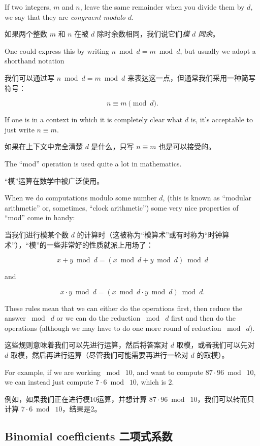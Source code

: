If two integers, $m$ and $n$, leave the same remainder when you
divide them by $d$, we say that they are 
\emph{congruent modulo $d$}.

如果两个整数 $m$ 和 $n$ 在被 $d$ 除时余数相同，我们说它们\emph{模 $d$ 同余}。

One could express this by writing $n \bmod d = m \bmod d$, but usually
we adopt a shorthand notation

我们可以通过写 $n \bmod d = m \bmod d$ 来表达这一点，但通常我们采用一种简写符号：

\[ n \equiv m \pmod{d}.
\]

If one is in a context in which it is completely clear what $d$ is, it's
acceptable to just write $n \equiv m$.

如果在上下文中完全清楚 $d$ 是什么，只写 $n \equiv m$ 也是可以接受的。

The ``mod'' operation is used quite a lot in mathematics.

“模”运算在数学中被广泛使用。

When we do 
computations modulo some number $d$, (this is known as ``modular arithmetic''
or, sometimes, ``clock arithmetic'') some very nice properties of ``mod''
come in handy:

当我们进行模某个数 $d$ 的计算时（这被称为“模算术”或有时称为“时钟算术”），“模”的一些非常好的性质就派上用场了：

\[ x + y \bmod d = ( x \bmod d + y \bmod d ) \bmod d \]

\noindent and

\[ x \cdot y \bmod d = ( x \bmod d \cdot y \bmod d ) \bmod d.
\] 

These rules mean that we can either do the operations first, then 
reduce the answer $\bmod\; d$ or we can do the reduction $\bmod\; d$ 
first and then do the operations (although we may have to do one 
more round of reduction $\bmod\; d$).

这些规则意味着我们可以先进行运算，然后将答案对 $d$ 取模，或者我们可以先对 $d$ 取模，然后再进行运算（尽管我们可能需要再进行一轮对 $d$ 的取模）。

For example, if we are working $\bmod\; 10$, and want to compute 
$87 \cdot 96 \bmod\; 10$, we can instead just compute $7 \cdot 6 \bmod\; 10$,
which is $2$.

例如，如果我们正在进行模10运算，并想计算 $87 \cdot 96 \bmod\; 10$，我们可以转而只计算 $7 \cdot 6 \bmod\; 10$，结果是2。

\subsection{Binomial coefficients 二项式系数}
\label{binom_coeff}

